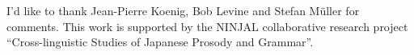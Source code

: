 \documentclass[output=paper,biblatex,babelshorthands,newtxmath,draftmode,colorlinks,citecolor=brown]{langscibook}
\begin{document}
\section*{\acknowledgmentsUS}

I'd like to thank Jean-Pierre Koenig, Bob Levine and Stefan Müller
for comments. This work is supported by the NINJAL collaborative
research project ``Cross-linguistic Studies of Japanese Prosody and Grammar''.

{\sloppy
\printbibliography[heading=subbibliography,notkeyword=this] 
}
\end{document}
